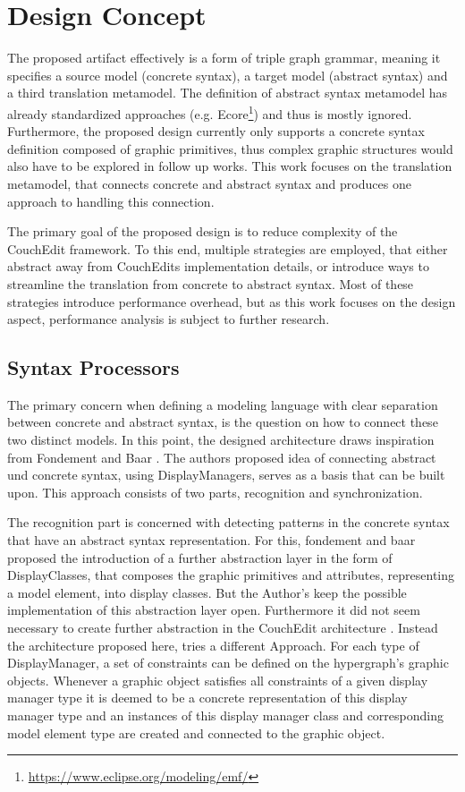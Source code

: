 \chapter{Design Concept}
\label{chap:design}
The proposed artifact effectively is a form of triple graph grammar, meaning it specifies a source model (concrete syntax), a target model (abstract syntax) and a third translation metamodel. The definition of abstract syntax metamodel has already standardized approaches (e.g. Ecore\footnote{\url{https://www.eclipse.org/modeling/emf/}}) and thus is mostly ignored. Furthermore, the proposed design currently only supports a concrete syntax definition composed of graphic primitives, thus complex graphic structures would also have to be explored in follow up works. This work focuses on the translation metamodel, that connects concrete and abstract syntax and produces one approach to handling this connection.

The primary goal of the proposed design is to reduce complexity of the CouchEdit framework. To this end, multiple strategies are employed, that either abstract away from CouchEdits implementation details, or introduce ways to streamline the translation from concrete to abstract syntax. Most of these strategies introduce performance overhead, but as this work focuses on the design aspect, performance analysis is subject to further research. 



\section{Syntax Processors}
The primary concern when defining a modeling language with clear separation between concrete and abstract syntax, is the question on how to connect these two distinct models. In this point, the designed architecture draws inspiration from Fondement and Baar \cite{fondement_making_2005}. The authors proposed idea of connecting abstract und concrete syntax, using DisplayManagers, serves as a basis that can be built upon. This approach consists of two parts, recognition and synchronization. 

The recognition part is concerned with detecting patterns in the concrete syntax that have an abstract syntax representation. For this, fondement and baar proposed the introduction of a further abstraction layer in the form of DisplayClasses, that composes the graphic primitives and attributes, representing a model element, into display classes. But the Author's keep the possible implementation of this abstraction layer open. Furthermore it did not seem necessary to create further abstraction in the CouchEdit architecture . Instead the architecture proposed here, tries a different Approach. For each type of DisplayManager, a set of constraints can be defined on the hypergraph's graphic objects. Whenever a graphic object satisfies all constraints of a given display manager type it is deemed to be a concrete representation of this display manager type and an instances of this display manager class and corresponding model element type are created and connected to the graphic object. 

